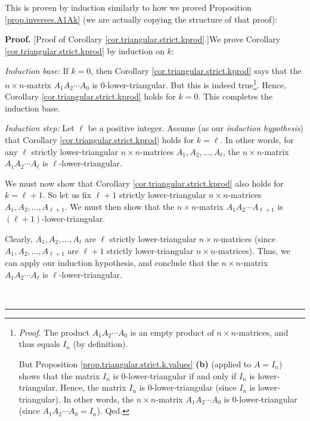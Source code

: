 \documentclass[numbers=enddot,12pt,final,onecolumn,notitlepage]{scrartcl}%
\theoremstyle{definition}
\newenvironment{proof}[1][Proof]{\noindent\textbf{#1.} }{\ \rule{0.5em}{0.5em}}
\begin{document}
This is proven by induction similarly to how we proved Proposition
\ref{prop.inverses.A1Ak} (we are actually copying the structure of that proof):

\begin{proof}
[Proof of Corollary \ref{cor.triangular.strict.kprod}.]We prove Corollary
\ref{cor.triangular.strict.kprod} by induction on $k$:

\textit{Induction base:} If $k=0$, then Corollary
\ref{cor.triangular.strict.kprod} says that the $n\times n$-matrix $A_{1}%
A_{2}\cdots A_{0}$ is $0$-lower-triangular. But this is indeed
true\footnote{\textit{Proof.} The product $A_{1}A_{2}\cdots A_{0}$ is an empty
product of $n\times n$-matrices, and thus equals $I_{n}$ (by definition).
\par
But Proposition \ref{prop.triangular.strict.k.values} \textbf{(b)} (applied to
$A=I_{n}$) shows that the matrix $I_{n}$\textbf{ }is $0$-lower-triangular if
and only if $I_{n}$ is lower-triangular. Hence, the matrix $I_{n}$ is
$0$-lower-triangular (since $I_{n}$ is lower-triangular). In other words, the
$n\times n$-matrix $A_{1}A_{2}\cdots A_{0}$ is $0$-lower-triangular (since
$A_{1}A_{2}\cdots A_{0}=I_{n}$). Qed.}. Hence, Corollary
\ref{cor.triangular.strict.kprod} holds for $k=0$. This completes the
induction base.

\textit{Induction step:} Let $\ell$ be a positive integer. Assume (as our
\textit{induction hypothesis}) that Corollary
\ref{cor.triangular.strict.kprod} holds for $k=\ell$. In other words, for any
$\ell$ strictly lower-triangular $n\times n$-matrices $A_{1},A_{2}%
,\ldots,A_{\ell}$, the $n\times n$-matrix $A_{1}A_{2}\cdots A_{\ell}$ is
$\ell$-lower-triangular.

We must now show that Corollary \ref{cor.triangular.strict.kprod} also holds
for $k=\ell+1$. So let us fix $\ell+1$ strictly lower-triangular $n\times
n$-matrices $A_{1},A_{2},\ldots,A_{\ell+1}$. We must then show that the
$n\times n$-matrix $A_{1}A_{2}\cdots A_{\ell+1}$ is $\left(  \ell+1\right)  $-lower-triangular.

Clearly, $A_{1},A_{2},\ldots,A_{\ell}$ are $\ell$ strictly lower-triangular
$n\times n$-matrices (since $A_{1},A_{2},\ldots,A_{\ell+1}$ are $\ell+1$
strictly lower-triangular $n\times n$-matrices). Thus, we can apply our
induction hypothesis, and conclude that the $n\times n$-matrix $A_{1}%
A_{2}\cdots A_{\ell}$ is $\ell$-lower-triangular.


\end{proof}
\end{document}
